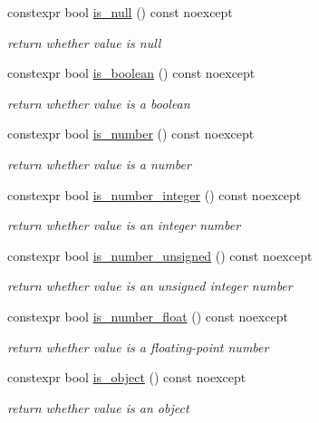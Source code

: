 \begin{DoxyCompactItemize}
constexpr bool \hyperlink{classnlohmann_1_1basic__json_a8abdfc0d6e051f6fa29d49da57bce631}{is\+\_\+null} () const noexcept
\begin{DoxyCompactList}\small\item\em return whether value is null \end{DoxyCompactList}\item 
constexpr bool \hyperlink{classnlohmann_1_1basic__json_adade77415e7f7bf08a9b5150c742714d}{is\+\_\+boolean} () const noexcept
\begin{DoxyCompactList}\small\item\em return whether value is a boolean \end{DoxyCompactList}\item 
constexpr bool \hyperlink{classnlohmann_1_1basic__json_a957eb9594c7f0ca93212c30f3a400873}{is\+\_\+number} () const noexcept
\begin{DoxyCompactList}\small\item\em return whether value is a number \end{DoxyCompactList}\item 
constexpr bool \hyperlink{classnlohmann_1_1basic__json_a435c93d06ef28f8003c31f62ffe4aed1}{is\+\_\+number\+\_\+integer} () const noexcept
\begin{DoxyCompactList}\small\item\em return whether value is an integer number \end{DoxyCompactList}\item 
constexpr bool \hyperlink{classnlohmann_1_1basic__json_aa388dc101bc285a98122a38fd2e3a9db}{is\+\_\+number\+\_\+unsigned} () const noexcept
\begin{DoxyCompactList}\small\item\em return whether value is an unsigned integer number \end{DoxyCompactList}\item 
constexpr bool \hyperlink{classnlohmann_1_1basic__json_a7641371be8a347f3c1e05ac089a74c36}{is\+\_\+number\+\_\+float} () const noexcept
\begin{DoxyCompactList}\small\item\em return whether value is a floating-\/point number \end{DoxyCompactList}\item 
constexpr bool \hyperlink{classnlohmann_1_1basic__json_a94ba313c00f1713fa4be85de64083754}{is\+\_\+object} () const noexcept
\begin{DoxyCompactList}\small\item\em return whether value is an object \end{DoxyCompactList}\item 

\end{DoxyCompactItemize}
